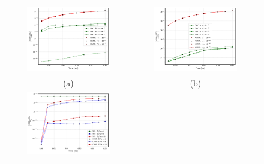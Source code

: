 \begin{figure}[h!]
\begin{center}
\begin{tabular}{cc}
\hspace*{-1.0cm}
\includegraphics[width=0.7\textwidth]{plots/raindrop/raindrop_mass_conv_16ppd.png} & 
\hspace{-0.2cm}%
\includegraphics[width=0.7\textwidth]{plots/raindrop/raindrop_mass_conv_clipping.png} \\ 
\hspace{-0.2cm}%
(a) & (b) \\
\hspace*{-1.0cm}
\includegraphics[width=0.7\textwidth]{plots/raindrop/raindrop_mass_conv_resolution.png} & 

\end{tabular}
\end{center}
\end{figure}
